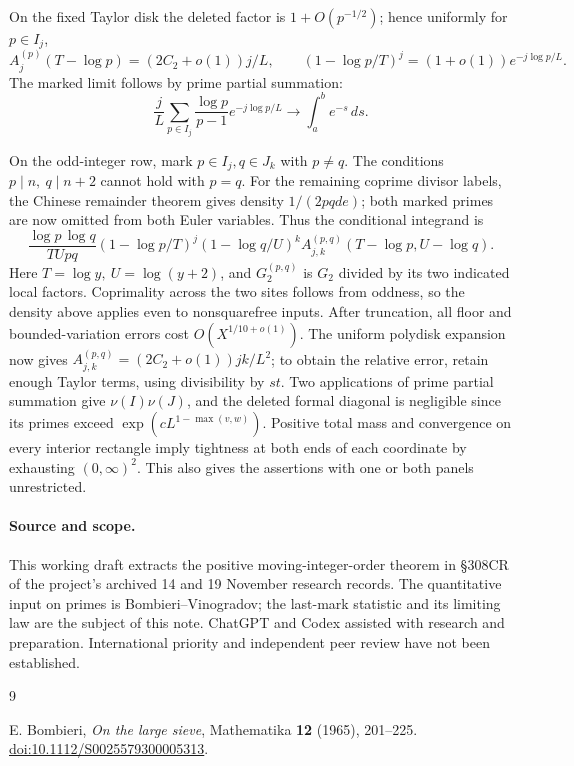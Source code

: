 \documentclass[11pt]{article}
\begin{document}
On the fixed Taylor disk the deleted factor is \(1+O(p^{-1/2})\); hence uniformly for \(p\in I_j\),
\[
 A^{(p)}_j(T-\log p)=(2C_2+o(1))j/L,\qquad
 (1-\log p/T)^j=(1+o(1))e^{-j\log p/L}.
\]
The marked limit follows by prime partial summation:
\[
 \frac{j}{L}\sum_{p\in I_j}\frac{\log p}{p-1}e^{-j\log p/L}
 \longrightarrow \int_a^b e^{-s}\,ds .
\]

On the odd-integer row, mark \(p\in I_j,q\in J_k\) with \(p\ne q\). The conditions \(p\mid n,\ q\mid n+2\) cannot hold with \(p=q\). For the remaining coprime divisor labels, the Chinese remainder theorem gives density \(1/(2pqde)\); both marked primes are now omitted from both Euler variables. Thus the conditional integrand is
\[
 \frac{\log p\,\log q}{T U p q}
 (1-\log p/T)^j(1-\log q/U)^k
 A^{(p,q)}_{j,k}(T-\log p,U-\log q).
\]
Here \(T=\log y,\ U=\log(y+2)\), and \(G_2^{(p,q)}\) is \(G_2\) divided by its two indicated local factors. Coprimality across the two sites follows from oddness, so the density above applies even to nonsquarefree inputs. After truncation, all floor and bounded-variation errors cost \(O(X^{1/10+o(1)})\). The uniform polydisk expansion now gives \(A^{(p,q)}_{j,k}=(2C_2+o(1))jk/L^2\); to obtain the relative error, retain enough Taylor terms, using divisibility by \(st\). Two applications of prime partial summation give \(\nu(I)\nu(J)\), and the deleted formal diagonal is negligible since its primes exceed \(\exp(cL^{1-\max(v,w)})\). Positive total mass and convergence on every interior rectangle imply tightness at both ends of each coordinate by exhausting \((0,\infty)^2\). This also gives the assertions with one or both panels unrestricted.

\paragraph{Source and scope.} This working draft extracts the positive moving-integer-order theorem in \S308CR of the project's archived 14 and 19 November research records. The quantitative input on primes is Bombieri--Vinogradov; the last-mark statistic and its limiting law are the subject of this note. ChatGPT and Codex assisted with research and preparation. International priority and independent peer review have not been established.

\begin{thebibliography}{9}\raggedright
{} E. Bombieri, \emph{On the large sieve}, Mathematika \textbf{12} (1965), 201--225. \href{https://doi.org/10.1112/S0025579300005313}{doi:10.1112/S0025579300005313}.
\end{thebibliography}
\end{document}
